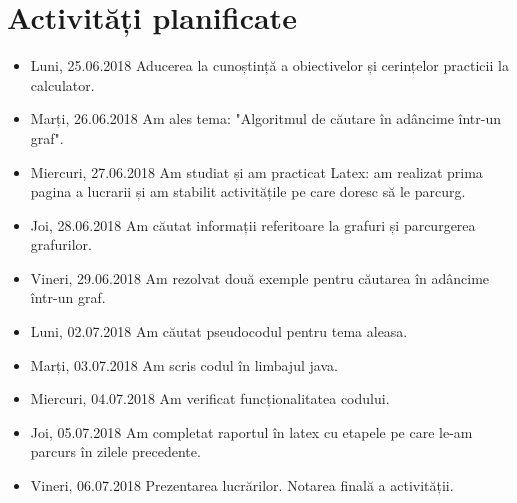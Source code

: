 \documentclass{report}
\begin{document}
\chapter{Activități planificate}
\begin{itemize}
\item  Luni, 25.06.2018 \newline
Aducerea la cunoștință a obiectivelor și cerințelor practicii la calculator.
\item  Marți, 26.06.2018 \newline
Am ales tema: "Algoritmul de căutare în adâncime într-un graf".
\item  Miercuri, 27.06.2018 \newline
Am studiat și am practicat Latex: am realizat prima pagina a lucrarii și am stabilit activitățile pe care doresc să le parcurg.
\item  Joi, 28.06.2018 \newline
Am căutat informații referitoare la grafuri și parcurgerea grafurilor.
\item  Vineri, 29.06.2018  \newline
Am rezolvat două exemple pentru căutarea în adâncime  într-un graf.
\item  Luni, 02.07.2018  \newline
Am căutat pseudocodul pentru tema aleasa.
\item  Marți, 03.07.2018  \newline
Am scris codul în limbajul java.
\item  Miercuri, 04.07.2018  \newline
Am verificat funcționalitatea codului. 
\item  Joi, 05.07.2018  \newline
Am completat raportul în latex cu etapele pe care le-am parcurs în zilele precedente.
\item  Vineri, 06.07.2018  \newline
Prezentarea lucrărilor.
Notarea finală a activității.
\end{itemize}
\end{document}
